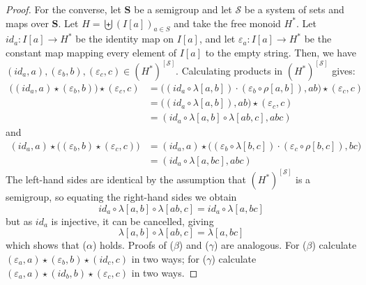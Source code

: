 \documentclass[10pt,a4paper]{amsart}
\begin{document}
\begin{proof}
For the converse, let $\mathbf{S}$ be a semigroup and let
$\mathcal{S}$ be a system of sets and maps over $\mathbf{S}$.
Let $H = \biguplus (I[a])_{a\in S}$ 
and take the free monoid $H^*$. Let
$id_a\colon I[a] \to H^*$ be the identity map on $I[a]$,
and let $\varepsilon_a\colon I[a] \to H^*$ be the constant map mapping
every element of $I[a]$ to the empty string. Then, we have
$(id_a,a), (\varepsilon_b,b), (\varepsilon_c,c)\in 
(H^*)^{[\mathcal{S}]}$. Calculating products in $(H^*)^{[\mathcal{S}]}$ gives:
\begin{align*}
\bigl((id_a,a)\star (\varepsilon_b,b)\bigr)\star (\varepsilon_c,c)
 &=  \bigl((id_a\circ \lambda[a,b])\cdot(\varepsilon_b\circ\rho[a,b]), ab\bigr)\star (\varepsilon_c,c)\\
  &=  \bigl((id_a\circ \lambda[a,b]), ab\bigr)\star (\varepsilon_c,c)\\
 &=  (id_a\circ \lambda[a,b]\circ\lambda[ab,c], abc)
\end{align*}  
and 
\begin{align*}
(id_a,a)\star \bigl((\varepsilon_b,b)\star (\varepsilon_c,c)\bigr)
 &=  (id_a,a)\star\bigl((\varepsilon_b\circ\lambda[b,c])\cdot(\varepsilon_c\circ\rho[b,c]), bc\bigr)\\
 &=  (id_a\circ \lambda[a,bc],abc)
\end{align*}
The left-hand sides are identical by the assumption that
$(H^*)^{[\mathcal{S}]}$ is a semigroup, so equating the 
right-hand sides we obtain
$$ 
id_a\circ \lambda[a,b]\circ\lambda[ab,c] = id_a\circ \lambda[a,bc]
$$
but as $id_a$ is injective, it can  be cancelled, giving
$$ 
\lambda[a,b]\circ\lambda[ab,c] = \lambda[a,bc]
$$
which shows that ($\alpha$) holds. Proofs of ($\beta$) and ($\gamma$) are
analogous. For ($\beta$) calculate
$(\varepsilon_a,a)\star (\varepsilon_b,b)\star (id_c,c)$ in two ways; for ($\gamma$)
calculate $(\varepsilon_a,a)\star (id_b,b)\star (\varepsilon_c,c)$ in two ways. 
\end{proof}
\end{document}
